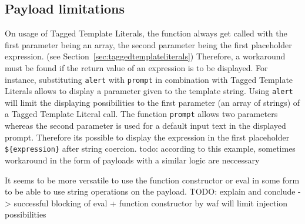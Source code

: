 \subsection{Payload limitations}
\label{sec:payloadlimitations}
On usage of Tagged Template Literals, the function always get called with the first parameter being an array, the second parameter being the first placeholder expression. (see Section~\ref{sec:taggedtemplateliterals}) Therefore, a workaround must be found if the return value of an expression is to be displayed. For instance, substituting \verb|alert| with \verb|prompt| in combination with Tagged Template Literals allows to display a parameter given to the template string. Using \verb|alert| will limit the displaying possibilities to the first parameter (an array of strings) of a Tagged Template Literal call. The function \verb|prompt| allows two parameters whereas the second parameter is used for a default input text in the displayed prompt. \cite{js/prompt} Therefore its possible to display the expression in the first placeholder \verb|${expression}| after string coercion. {\color{red} todo: according to this example, sometimes workaround in the form of payloads with a similar logic are neccessary}

It seems to be more versatile to use the function constructor or eval in some form to be able to use string operations on the payload. {\color{red} TODO: explain and conclude -> successful blocking of eval + function constructor by waf will limit injection possibilities}
